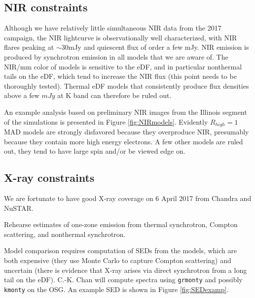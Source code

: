 \documentclass[twocolumn,tighten,dvipsnames]{aastex63}
\newcommand\<{{\langle}}
\renewcommand\>{{\rangle}} %
\begin{document}
\subsection{NIR constraints}
\label{sec:nirconst}

Although we have relatively little simultaneous NIR data from the 2017 campaign, the NIR lightcurve is observationally well characterized, with NIR flares peaking at $\sim 30$mJy and quiescent flux of order a few mJy.  NIR emission is produced by synchrotron emission in all models that we are aware of.  The NIR/mm color of models is sensitive to the eDF, and in particular nonthermal tails on the eDF, which tend to increase the NIR flux (this point needs to be thoroughly tested).  Thermal eDF models that consistently produce flux densities above a few $mJy$ at K band can therefore be ruled out.

An example analysis based on preliminary NIR images from the Illinois segment of the simulations is presented in Figure \ref{fig:NIRmodels}.  Evidently $R_{high} = 1$ MAD models are strongly disfavored because they overproduce NIR, presumably because they contain more high energy electrons.  A few other models are ruled out, they tend to have large spin and/or be viewed edge on.

\begin{figure*}
  \caption{Left: MAD models, Right: SANE models.  Models marked with a red dot consistently overproduce NIR emission, green dots indicate models that do not overproduce NIR.  The inclination is indicated by the position of the dot, with face-on models near twelve o'clock and edge-on models near three o'clock.}
  \label{fig:NIRmodels}
\end{figure*}

\subsection{X-ray constraints}
\label{sec:xrayconst}

We are fortunate to have good X-ray coverage on 6 April 2017 from Chandra and NuSTAR.

Rehearse estimates of one-zone emission from thermal synchrotron, Compton scattering, and nonthermal synchrotron.

Model comparison requires computation of SEDs from the models, which are both expensive (they use Monte Carlo to capture Compton scattering) and uncertain (there is evidence that X-ray arises via direct synchrotron from a long tail on the eDF).  C.-K. Chan will compute spectra using {\tt grmonty} and possibly {\tt kmonty} on the OSG.  An example SED is shown in Figure \ref{fig:SEDexamp}.
\end{document}
